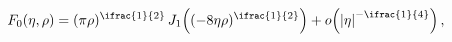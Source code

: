 \[\mathop{F_{0}\/}\nolimits\!\left(\eta,\rho\right)=(\pi\rho)^{\ifrac{1}{2}}%
\mathop{J_{1}\/}\nolimits\!\left((-8\eta\rho)^{\ifrac{1}{2}}\right)+\mathop{o%
\/}\nolimits\!\left(\left|\eta\right|^{-\ifrac{1}{4}}\right),\]